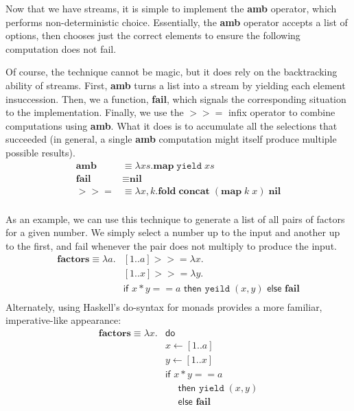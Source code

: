 \documentclass[11pt]{article}
\newcommand\x{\lambda x}
\begin{document}
Now that we have streams, it is simple to implement the \textbf{amb} operator, which performs non-deterministic choice.
Essentially, the \textbf{amb} operator accepts a list of options, then chooses just the correct elements to ensure the following computation does not fail.

Of course, the technique cannot be magic, but it does rely on the backtracking ability of streams.
First, \textbf{amb} turns a list into a stream by yielding each element insuccession.
Then, we a function, \textbf{fail}, which signals the corresponding situation to the implementation.
Finally, we use the $>\!>=$ infix operator to combine computations using \textbf{amb}.
What it does is to accumulate all the selections that succeeded (in general, a single \textbf{amb} computation might itself produce multiple possible results).
\begin{align*}
\textbf{amb} &\equiv \x s. \textbf{map}\;\texttt{yield}\;xs \\
\textbf{fail} &\equiv \textbf{nil} \\
>\!>= &\equiv \lambda x,k. \textbf{fold}\;\textbf{concat}\;(\textbf{map}\;k\;x)\;\textbf{nil} \\
\end{align*}

As an example, we can use this technique to generate a list of all pairs of factors for a given number.
We simply select a number up to the input and another up to the first, and fail whenever the pair does not multiply to produce the input.
\begin{align*}
\textbf{factors} \equiv \lambda a. &[1..a] >\!>= \x. \\
                              &[1..x] >\!>= \lambda y. \\
                              &\textsf{if }x*y == a
                               \textsf{ then }\texttt{yeild}\;(x, y)
                               \textsf{ else }\textbf{fail} \\
\end{align*}
Alternately, using Haskell's do-syntax for monads provides a more familiar, imperative-like appearance:
\begin{align*}
\textbf{factors} \equiv \lambda x. &\textsf{do} \\
& x \leftarrow [1..a] \\
& y \leftarrow [1..x] \\
& \textsf{if }x*y == a \\
&\quad \textsf{ then }\texttt{yield}\;(x, y) \\
&\quad \textsf{ else }\textbf{fail} \\
\end{align*}
\end{document}
